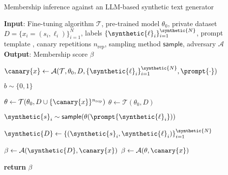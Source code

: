 
\begin{algorithm*}[tpb!]
\caption{Membership inference against an LLM-based synthetic text generator}
\label{alg:mia}
\begin{algorithmic}[1]
\STATE \textbf{Input}: Fine-tuning algorithm $\mathcal{T}$, pre-trained model $\theta_0$, private dataset $D = \{ x_i = (s_i, \ell_i) \}_{i=1}^N$, labels $\{\synthetic{\ell}_i\}_{i=1}^{\synthetic{N}}$, prompt template \prompt{\cdot}, canary repetitions $n_\text{rep}$, sampling method $\textsf{sample}$, adversary $\mathcal{A}$
\STATE \textbf{Output}: Membership score $\beta$

\STATE $\canary{x} \gets \mathcal{A}(\mathcal{T}, \theta_0, D, \{\synthetic{\ell}_i\}_{i=1}^{\synthetic{N}}, \prompt{\cdot})$ 
\hfill {}

\STATE $b \sim \{0,1\}$ 
\hfill {}

    \STATE $\theta \gets \mathcal{T}(\theta_0, D \cup \{\canary{x}\}^{n_\textrm{rep}})$
    \hfill {}
\ELSE
    \STATE $\theta \gets \mathcal{T}(\theta_0, D)$
    \hfill {}
\ENDIF

    \STATE $\synthetic{s}_i \sim \textsf{sample}(\theta(\prompt{\synthetic{\ell}_i}))$
    \hfill {}
\ENDFOR

\STATE $\synthetic{D} \gets \left\{ (\synthetic{s}_i, \synthetic{\ell}_i) \right\}_{i=1}^\synthetic{N}$

    \STATE $\beta \gets \mathcal{A}(\synthetic{D}, \canary{x})$
    \hfill {}
\ELSE
    \STATE $\beta \gets \mathcal{A}(\theta, \canary{x})$ 
    \hfill {}
\ENDIF

\STATE \textbf{return} $\beta$
\end{algorithmic}
\end{algorithm*}
